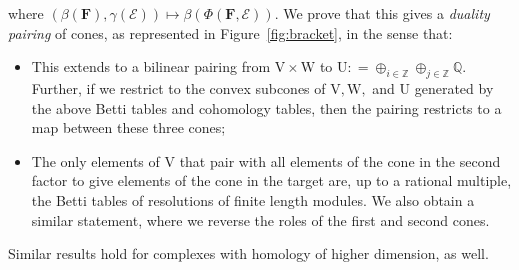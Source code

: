 \documentclass[12pt]{amsart}
\theoremstyle{definition}
\theoremstyle{remark}
\newcommand{\ZZ}{\mathbb{Z}}
\newcommand{\QQ}{\mathbb{Q}}
\newcommand{\UU}{\mathrm{U}}
\newcommand{\VV}{\mathrm{V}}
\newcommand{\WW}{\mathrm{W}}
\newcommand{\cE}{\mathcal{E}}
\newcommand{\FF}{\mathbf{F}}
\begin{document}
where $(\beta(\FF),\gamma(\cE))\mapsto \beta(\Phi(\FF,\cE))$.  
We prove that this  gives a  \emph{duality pairing} of cones, as represented in Figure~\ref{fig:bracket},
in the sense that:
\begin{itemize}
\item This extends to a bilinear pairing from $\VV\times \WW$ to $\UU: = \oplus_{i\in \ZZ} \oplus_{j\in \ZZ}\QQ$.  Further, if we restrict to the convex subcones of $\VV, \WW,$ and $\UU$ generated by the above Betti tables and cohomology tables, then the pairing restricts to a map between these three cones;
\item The only elements of $\VV$ that pair with all elements of the cone in the second factor
 to give elements of the cone in the target are, up to a rational multiple, the Betti tables of  resolutions of finite length modules.  We also obtain a similar statement, where we reverse the roles of 
 the first and second cones.
\end{itemize}
Similar results hold for complexes with homology of higher dimension, as well. 
\end{document}
